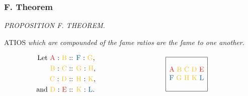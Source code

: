 \documentclass[12pt,preview]{standalone}
\begin{document}
\subsubsection{F. Theorem}

\newcommand{\redA}{{\color{cred}{A}}}
\newcommand{\redE}{{\color{cred}{E}}}

\newcommand{\blueF}{{\color{cblue}{F}}}
\newcommand{\blueL}{{\color{cblue}{L}}}

\newcommand{\yellowB}{{\color{cyellow}{B}}}
\newcommand{\yellowC}{{\color{cyellow}{C}}}
\newcommand{\yellowD}{{\color{cyellow}{D}}}
\newcommand{\yellowG}{{\color{cyellow}{G}}}
\newcommand{\yellowH}{{\color{cyellow}{H}}}
\newcommand{\yellowK}{{\color{cyellow}{K}}}

\begin{minipage}{\textwidth}

    \begin{center}
        \textit{PROPOSITION F. THEOREM.}\label{book5prF} \\
    \end{center}

    \hfill

    \begin{center}
        \raggedright \lettrine[lines=4, loversize=1, nindent=0pt]{}{}ATIOS \textit{which are compounded of the ſame ratios are the ſame to one another}.
    \end{center}

    \hfill

    \hfill

    \hfill

    \hfill

    \hfill

    $\begin{array}{c c}
            \qquad \qquad \begin{aligned}\text{Let \redA\ : \yellowB\ } & \text{:: \blueF\ : \yellowG},   \\
               \text{\yellowB\ : \yellowC\ }  & \text{:: \yellowG\ : \yellowH}, \\
               \text{\yellowC\ : \yellowD\ }  & \text{:: \yellowH\ : \yellowK}, \\
               \text{and \yellowD\ : \redE\ } & \text{:: \yellowK\ : \blueL}.   \\
                          \end{aligned} \qquad \qquad \qquad \qquad \qquad
            \begin{array}{|c|} \hline\\ \text{\redA}\ \text{\yellowB}\ \text{\yellowC}\ \text{\yellowD}\ \text{\redE} \\ \text{\blueF}\ \text{\yellowG}\ \text{\yellowH}\ \text{\yellowK}\ \text{\blueL} \\ \\ \hline \end{array}
        \end{array}$


\end{minipage}
\end{document}
